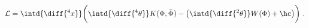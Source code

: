 \begin{equation}
  \label{eq:localkahler}
    \mathcal{L} = \intd{\diff{^4x}} \biggl( \intd{\diff{^4 \theta}} K(\Phi,
  \bar{\Phi}) - \bigl(\intd{\diff{^2 \theta}} W(\Phi) + \hc \bigr) \biggr)\ .
\end{equation}

